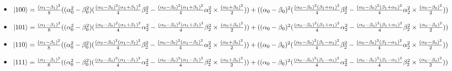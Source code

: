 \begin{itemize}
\item[] \(\ket{100} = \frac{(\alpha_1 - \beta_1)^2}{8}((\alpha^2_0 - \beta^2_0)(\frac{(\alpha_0 - \beta_0)^2(\alpha_1 + \beta_1)^2}{4}\beta^2_2 - \frac{(\alpha_0 - \beta_0)^2(\alpha_1 + \beta_1)^2}{4}\alpha^2_2 \times \frac{(\alpha_0 + \beta_0)^2}{2})) + ((\alpha_0 - \beta_0)^2(\frac{(\alpha_0 - \beta_0)^2(\beta_1 + \alpha_1)^2}{4}\beta^2_2 - \frac{(\alpha_0 - \beta_0)^2(\beta_1 + \alpha_1)^2}{4}\alpha^2_2 \times \frac{(\alpha_0 - \beta_0)^2}{2}))\)

\item[] \(\ket{101} = \frac{(\alpha_1 - \beta_1)^2}{8}((\alpha^2_0 - \beta^2_0)(\frac{(\alpha_0 - \beta_0)^2(\alpha_1 + \beta_1)^2}{4}\alpha^2_2 - \frac{(\alpha_0 - \beta_0)^2(\alpha_1 + \beta_1)^2}{4}\beta^2_2 \times \frac{(\alpha_0 + \beta_0)^2}{2})) + ((\alpha_0 - \beta_0)^2(\frac{(\alpha_0 - \beta_0)^2(\beta_1 + \alpha_1)^2}{4}\alpha^2_2 - \frac{(\alpha_0 - \beta_0)^2(\beta_1 + \alpha_1)^2}{4}\beta^2_2 \times \frac{(\alpha_0 - \beta_0)^2}{2}))\)

\item[] \(\ket{110} = \frac{(\alpha_1 - \beta_1)^2}{8}((\alpha^2_0 - \beta^2_0)(\frac{(\alpha_0 - \beta_0)^2(\alpha_1 - \beta_1)^2}{4}\beta^2_2 - \frac{(\alpha_0 - \beta_0)^2(\alpha_1 - \beta_1)^2}{4}\alpha^2_2 \times \frac{(\alpha_0 + \beta_0)^2}{2})) + ((\alpha_0 - \beta_0)^2(\frac{(\alpha_0 - \beta_0)^2(\beta_1 - \alpha_1)^2}{4}\beta^2_2 - \frac{(\alpha_0 - \beta_0)^2(\beta_1 - \alpha_1)^2}{4}\alpha^2_2 \times \frac{(\alpha_0 - \beta_0)^2}{2}))\) 

\item[] \(\ket{111} = \frac{(\alpha_1 - \beta_1)^2}{8}((\alpha^2_0 - \beta^2_0)(\frac{(\alpha_0 - \beta_0)^2(\alpha_1 - \beta_1)^2}{4}\alpha^2_2 - \frac{(\alpha_0 - \beta_0)^2(\alpha_1 - \beta_1)^2}{4}\beta^2_2 \times \frac{(\alpha_0 + \beta_0)^2}{2})) + ((\alpha_0 - \beta_0)^2(\frac{(\alpha_0 - \beta_0)^2(\beta_1 - \alpha_1)^2}{4}\alpha^2_2 - \frac{(\alpha_0 - \beta_0)^2(\beta_1 - \alpha_1)^2}{4}\beta^2_2 \times \frac{(\alpha_0 - \beta_0)^2}{2}))\) 

\end{itemize}

